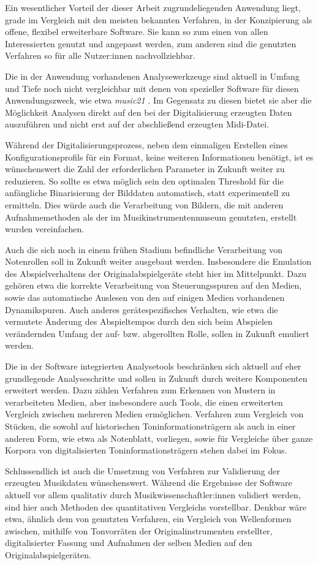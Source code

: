 Ein wesentlicher Vorteil der dieser Arbeit zugrundeliegenden Anwendung liegt, grade im Vergleich mit den meisten bekannten Verfahren, in der Konzipierung als offene, flexibel erweiterbare Software.
Sie kann so zum einen von allen Interessierten genutzt und angepasst werden, zum anderen sind die genutzten Verfahren so für alle Nutzer:innen nachvollziehbar.

Die in der Anwendung vorhandenen Analysewerkzeuge sind aktuell in Umfang und Tiefe noch nicht vergleichbar mit denen von spezieller Software für diesen Anwendungszweck, wie etwa \textit{music21} \parencite[]{music21}.
Im Gegensatz zu diesen bietet sie aber die Möglichkeit Analysen direkt auf den bei der Digitalisierung erzeugten Daten auszuführen und nicht erst auf der abschließend erzeugten Midi-Datei.

Während der Digitalisierungsprozess, neben dem einmaligen Erstellen eines Konfigurationsprofils für ein Format, keine weiteren Informationen benötigt, ist es wünschenswert die Zahl der erforderlichen Parameter in Zukunft weiter zu reduzieren.
So sollte es etwa möglich sein den optimalen Threshold für die anfängliche Binarisierung der Bilddaten automatisch, statt experimentell zu ermitteln.
Dies würde auch die Verarbeitung von Bildern, die mit anderen Aufnahmemethoden als der im Musikinstrumentenmuseum genutzten, erstellt wurden vereinfachen.

Auch die sich noch in einem frühen Stadium befindliche Verarbeitung von Notenrollen soll in Zukunft weiter ausgebaut werden.
Insbesondere die Emulation des Abspielverhaltens der Originalabspielgeräte steht hier im Mittelpunkt.
Dazu gehören etwa die korrekte Verarbeitung von Steuerungsspuren auf den Medien, sowie das automatische Auslesen von den auf einigen Medien vorhandenen Dynamikspuren.
Auch anderes gerätespezifisches Verhalten, wie etwa die vermutete Änderung des Abspieltempos durch den sich beim Abspielen verändernden Umfang der auf- bzw. abgerollten Rolle, sollen in Zukunft emuliert werden.

Die in der Software integrierten Analysetools beschränken sich aktuell auf eher grundlegende Analyseschritte und sollen in Zukunft durch weitere Komponenten erweitert werden.
Dazu zählen Verfahren zum Erkennen von Mustern in verarbeiteten Medien, aber insbesondere auch Tools, die einen erweiterten Vergleich zwischen mehreren Medien ermöglichen.
Verfahren zum Vergleich von Stücken, die sowohl auf historischen Toninformationsträgern als auch in einer anderen Form, wie etwa als Notenblatt, vorliegen, sowie für Vergleiche über ganze Korpora von digitalisierten Toninformationsträgern stehen dabei im Fokus. 

Schlussendlich ist auch die Umsetzung von Verfahren zur Validierung der erzeugten Musikdaten wünschenswert.
Während die Ergebnisse der Software aktuell vor allem qualitativ durch Musikwissenschaftler:innen validiert werden, sind hier auch Methoden des quantitativen Vergleichs vorstellbar.
Denkbar wäre etwa, ähnlich dem von \textcite[]{colmenares_2011} genutzten Verfahren, ein Vergleich von Wellenformen zwischen, mithilfe von Tonvorräten der Originalinstrumenten erstellter, digitalisierter Fassung und Aufnahmen der selben Medien auf den Originalabspielgeräten.